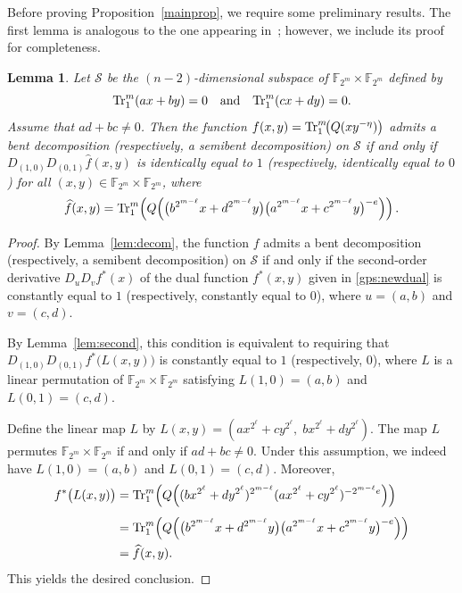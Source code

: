 \documentclass[12pt]{article}
\theoremstyle{plain}
\newtheorem{lemma}{Lemma}
\theoremstyle{definition}
\newcommand{\F}{\mathbb{F}}
\newcommand{\Tr}{{\rm Tr}}
\begin{document}
	Before proving Proposition~\ref{mainprop}, we require some preliminary results.
	The first lemma is analogous to the one appearing in~\cite{akkmpp26}; however, 
	we include its proof for completeness.
	
	\begin{lemma}\label{ftof}
		Let $\mathcal{S}$ be the $(n-2)$-dimensional subspace of $\F_{2^m}\times \F_{2^m}$ defined by
		\[
		\Tr_1^m(ax+by)=0
		\quad\text{and}\quad
		\Tr_1^m(cx+dy)=0.
		\]
		Assume that $ad+bc\neq 0$. Then the function $f(x,y)=\Tr_1^m\!\bigl(Q(xy^{-\eta})\bigr)$
		admits a bent decomposition (respectively, a semibent decomposition) on $\mathcal{S}$ if and only if $D_{(1,0)}D_{(0,1)}\widehat{f}(x,y)$
		is identically equal to $1$ (respectively, identically equal to $0$) for all \((x,y) \in \F_{2^m}\times \F_{2^m}\), where
		\[
		\widehat{f}(x,y)
		=
		\Tr_1^m\!\left(
		Q\!\left(
		\bigl(b^{2^{m-\ell}} x + d^{2^{m-\ell}} y\bigr)
		\bigl(a^{2^{m-\ell}} x + c^{2^{m-\ell}} y\bigr)^{-e}
		\right)
		\right).
		\]
	\end{lemma}
	\begin{proof}
		By Lemma~\ref{lem:decom}, the function $f$ admits a bent decomposition (respectively, a semibent decomposition) on $\mathcal{S}$ if and only if the second-order derivative $D_u D_v f^*(x)$
		of the dual function $f^*(x,y)$ given in \eqref{gps:newdual}
		is constantly equal to $1$ (respectively, constantly equal to $0$), where $u=(a,b)$ and $v=(c,d)$.
		
		By Lemma~\ref{lem:second}, this condition is equivalent to requiring that $D_{(1,0)} D_{(0,1)} f^*\bigl(L(x,y)\bigr)$
		is constantly equal to $1$ (respectively, $0$), where $L$ is a linear permutation of
		$\F_{2^m}\times\F_{2^m}$ satisfying $L(1,0)=(a,b)$ and $L(0,1)=(c,d)$.
		
		Define the linear map $L$ by $L(x,y)=(ax^{2^\ell}+cy^{2^\ell},\; bx^{2^\ell}+dy^{2^\ell})$.
		The map $L$ permutes $\F_{2^m}\times\F_{2^m}$ if and only if $ad+bc\neq 0$. Under this assumption, we indeed have
		$L(1,0)=(a,b)$ and $L(0,1)=(c,d)$. Moreover,
		\[
		\begin{aligned}
		f^*\bigl(L(x,y)\bigr)
		&=
		\Tr_1^m\!\left(
		Q\!\left(
		(bx^{2^\ell}+dy^{2^\ell})^{2^{m-\ell}}
		(ax^{2^\ell}+cy^{2^\ell})^{-2^{m-\ell}e}
		\right)
		\right) \\[4pt]
		&=
		\Tr_1^m\!\left(
		Q\!\left(
		\bigl(b^{2^{m-\ell}}x+d^{2^{m-\ell}}y\bigr)
		\bigl(a^{2^{m-\ell}}x+c^{2^{m-\ell}}y\bigr)^{-e}
		\right)
		\right) \\
		&= \widehat{f}(x,y).
		\end{aligned}
		\]
		This yields the desired conclusion.
	\end{proof}
\end{document}
